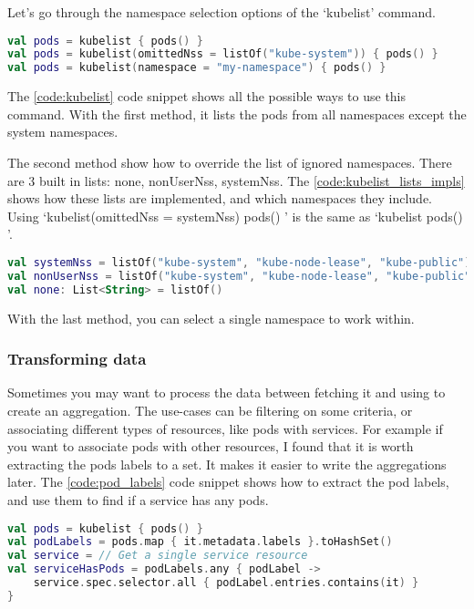 Let's go through the namespace selection options of the `kubelist' command.

\begin{lstlisting}[caption={Usages of kubelist},language=Kotlin,label=code:kubelist]
val pods = kubelist { pods() }
val pods = kubelist(omittedNss = listOf("kube-system")) { pods() }
val pods = kubelist(namespace = "my-namespace") { pods() }
\end{lstlisting}

The \ref{code:kubelist} code snippet shows all the possible ways to use this command. With the first method, it lists the pods from all namespaces except the system namespaces.

The second method show how to override the list of ignored namespaces. There are 3 built in lists: none, nonUserNss, systemNss. The \ref{code:kubelist_lists_impls} shows how these lists are implemented, and which namespaces they include. Using `kubelist(omittedNss = systemNss) { pods() }' is the same as `kubelist { pods() }'.

\begin{lstlisting}[caption={Usages of kubelist},language=Kotlin,label=code:kubelist_lists_impls]
val systemNss = listOf("kube-system", "kube-node-lease", "kube-public")
val nonUserNss = listOf("kube-system", "kube-node-lease", "kube-public", "default")
val none: List<String> = listOf()
\end{lstlisting}

With the last method, you can select a single namespace to work within.

\subsubsection{Transforming data}

Sometimes you may want to process the data between fetching it and using to create an aggregation. The use-cases can be filtering on some criteria, or associating different types of resources, like pods with services. For example if you want to associate pods with other resources, I found that it is worth extracting the pods labels to a set. It makes it easier to write the aggregations later. The \ref{code:pod_labels} code snippet shows how to extract the pod labels, and use them to find if a service has any pods.

\begin{lstlisting}[caption={Extraction of pod labels},language=Kotlin,label=code:pod_labels]
val pods = kubelist { pods() }
val podLabels = pods.map { it.metadata.labels }.toHashSet()
val service = // Get a single service resource
val serviceHasPods = podLabels.any { podLabel ->
    service.spec.selector.all { podLabel.entries.contains(it) }
}
\end{lstlisting}

